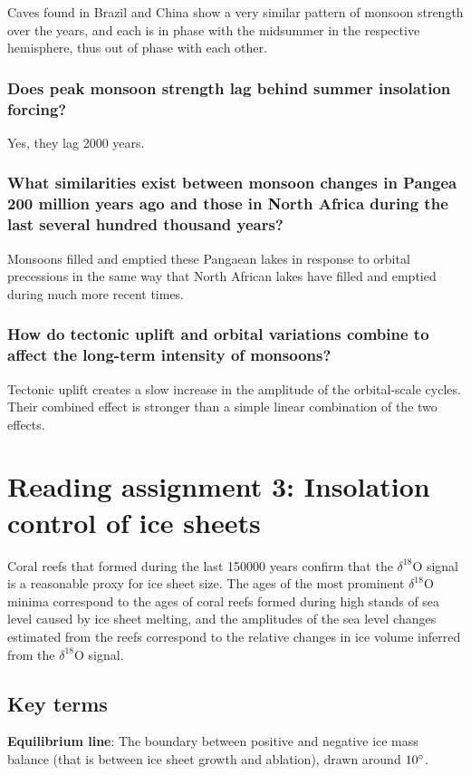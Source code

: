 Caves found in Brazil and China show a very similar pattern of monsoon strength
over the years, and each is in phase with the midsummer in the respective
hemisphere, thus out of phase with each other.

\subsubsection{Does peak monsoon strength lag behind summer insolation
forcing?}
Yes, they lag 2000 years.

\subsubsection{What similarities exist between monsoon changes in Pangea
200 million years ago and those in North Africa during the last several hundred
thousand years?}
Monsoons filled and emptied these Pangaean lakes in response to orbital
precessions in the same way that North African lakes have filled and emptied
during much more recent times.

\subsubsection{How do tectonic uplift and orbital variations combine to affect
the long-term intensity of monsoons?}
Tectonic uplift creates a slow increase in the amplitude of the orbital-scale
cycles. Their combined effect is stronger than a simple linear combination of
the two effects.

\section{Reading assignment 3: Insolation control of ice sheets}

Coral reefs that formed during the last 150000 years confirm that the
$\delta^{18}$O signal is a reasonable proxy for ice sheet size. The ages of the
most prominent $\delta^{18}$O minima correspond to the ages of coral reefs
formed during high stands of sea level caused by ice sheet melting, and the
amplitudes of the sea level changes estimated from the reefs correspond to the
relative changes in ice volume inferred from the $\delta^{18}$O signal.

\subsection{Key terms}

\textbf{Equilibrium line}:
The boundary between positive and negative ice mass balance (that is between
ice sheet growth and ablation), drawn around $10 \degree$.

